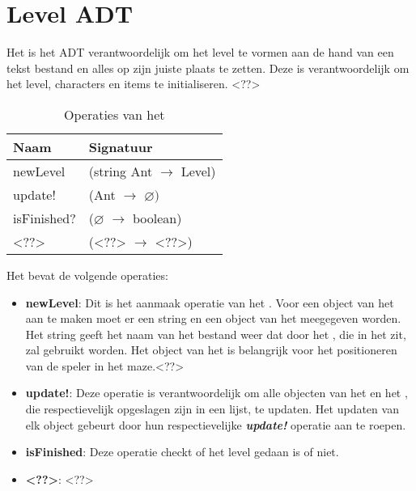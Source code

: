 \section{Level ADT}
\label{section:level}

Het \texttt{} is het ADT verantwoordelijk om het level te vormen aan de hand van een tekst bestand en alles op zijn juiste plaats te zetten.
Deze is verantwoordelijk om het level, characters en items te initialiseren.
<??>

\begin{table}[hbt]
\centering
\begin{tabular}{|ll|}
\hline
\rowcolor[HTML]{000000} 
{\color[HTML]{FFFFFF} \textbf{Naam}} & {\color[HTML]{FFFFFF} \textbf{Signatuur}} \\ \hline
newLevel                            & (string Ant $\rightarrow$ Level)   \\ \hline
update!                              & (Ant $\rightarrow$ $\varnothing)$    \\ \hline
isFinished?                          & ($\varnothing$ $\rightarrow$ boolean) \\ \hline
 <??>                                & (<??> $\rightarrow$ <??>)             \\ \hline
\end{tabular}
\caption{Operaties van het \texttt{}}
\label{table:level}
\end{table}

Het \texttt{} bevat de volgende operaties:

\begin{itemize}
	\item \textbf{newLevel}: Dit is het aanmaak operatie van het \texttt{}. Voor een object van het \texttt{} aan te maken moet er een string en een object van het \texttt{} meegegeven worden.
		Het string geeft het naam van het bestand weer dat door het \texttt{}, die in het \texttt{} zit, zal gebruikt worden.
		Het object van het \texttt{} is belangrijk voor het positioneren van de speler in het maze.<??>
	\item \textbf{update!}: Deze operatie is verantwoordelijk om alle objecten van het \texttt{} en het \texttt{}, die respectievelijk opgeslagen zijn in een lijst, te updaten.
		Het updaten van elk object gebeurt door hun respectievelijke \textit{\textbf{update!}} operatie aan te roepen.
	\item \textbf{isFinished}: Deze operatie checkt of het level gedaan is of niet.
	\item \textbf{<??>}: <??>
\end{itemize}

